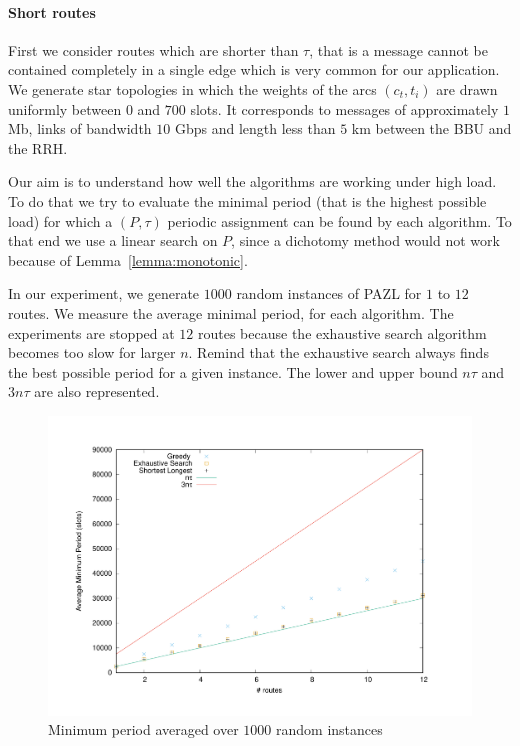 \documentclass[a4paper,10pt]{article}
\begin{document}
{      \paragraph{Short routes}
      
      First we consider routes which are shorter than $\tau$, that is a message cannot be contained 
      completely in a single edge which is very common for our application. We generate star topologies in which the weights of the arcs $(c_t,t_i)$ are drawn uniformly between $0$ and $700$ slots. It corresponds to messages of approximately $1$ Mb, links of bandwidth $10$ Gbps and length less than $5$ km between the BBU and the RRH. 
      
      Our aim is to understand how well the algorithms are working under high load. To do that we try to evaluate the 
      minimal period (that is the highest possible load) for which a $(P,\tau)$ periodic assignment can be found by each algorithm. 
      To that end we use a linear search on $P$, since a dichotomy method would not work because of Lemma~\ref{lemma:monotonic}.
      
      In our experiment, we generate $1000$ random instances of PAZL for $1$ to $12$ routes. 
      We measure the average minimal period, for each algorithm. The experiments are stopped at $12$ routes because the exhaustive search algorithm becomes too slow for larger $n$. Remind that the exhaustive search always finds the best possible period for a given instance. The lower and upper bound $n\tau$ and $3n\tau$ are also represented.
      
      
        
      \begin{figure}

      \begin{center}
	\includegraphics[scale=0.4]{periode_petite.pdf}
      \end{center}
      \caption{Minimum period averaged over $1000$ random instances}
      \end{figure}
      
}
\end{document}
